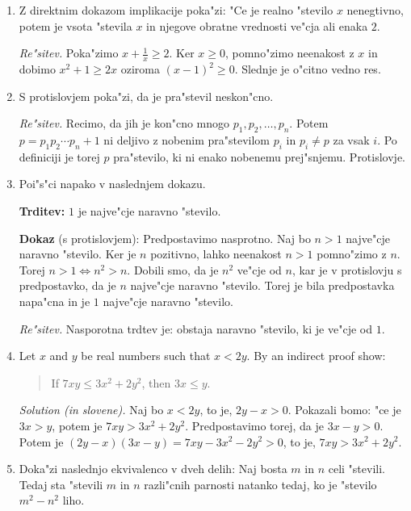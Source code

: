 \documentclass[11pt,paper=b5,footinclude,headinclude]{scrbook} %
\theoremstyle{remark}
\theoremstyle{definition} %
\theoremstyle{theorem} %
\begin{document}
\begin{enumerate}

\item Z direktnim dokazom implikacije poka"zi: "Ce je realno "stevilo $x$ nenegtivno, potem je vsota  "stevila $x$  in njegove obratne vrednosti  ve"cja ali enaka $2$.


\emph{ Re"sitev.} Poka"zimo $x + \frac{1}{x}\geq 2$. Ker $x\geq 0$, pomno"zimo neenakost z $x$ in dobimo
$x^2 + 1 \geq 2x$ oziroma $(x- 1)^2\geq 0$. Slednje je o"citno vedno res.

\item S protislovjem poka"zi, da je pra"stevil neskon"cno.

\emph{ Re"sitev.} Recimo, da jih je kon"cno mnogo $p_1,p_2,\ldots, p_n$. Potem  $p=p_1p_2\cdots p_n+1$ ni deljivo z nobenim pra"stevilom $p_i$ in $p_i\neq p$ za vsak $i$. Po definiciji je torej $p$ pra"stevilo, ki ni enako nobenemu prej"snjemu. Protislovje.

\item Poi"s"ci napako v naslednjem dokazu. 

\textbf{Trditev:} $1$ je najve"cje naravno "stevilo. 

\textbf{Dokaz} (s protislovjem):
Predpostavimo nasprotno. Naj bo $n>1$ najve"cje naravno "stevilo. Ker je $n$ pozitivno, lahko neenakost $n>1$ pomno"zimo z $n$. Torej $n>1\Leftrightarrow n^2>n$. Dobili smo, da je $n^2$ ve"cje od $n$, kar je v protislovju s predpostavko, da je $n$ najve"cje naravno "stevilo. Torej je bila predpostavka napa"cna in je $1$ najve"cje naravno "stevilo.

\emph{ Re"sitev.} Nasporotna trdtev je: obstaja naravno "stevilo, ki je ve"cje od $1$.


\item Let  $x$ and $y$ be real numbers such that $x<2y$. 
By an indirect proof show: 
\begin{quote}
    If $7xy\leq 3x^2 + 2y^2$, then $3x\leq y$.
\end{quote}

\emph{ Solution (in slovene).} Naj bo $x<2y$, to je, $2y-x>0$. Pokazali bomo: "ce je $3x> y$, potem je $7xy > 3x^2 + 2y^2$. Predpostavimo torej, da je $3x-y>0$. Potem je $(2y-x)(3x-y)= 7xy - 3x^2 - 2y^2>0$, to je, $7xy > 3x^2 + 2y^2$.

\item Doka"zi naslednjo ekvivalenco v dveh delih: Naj bosta $m$ in $n$ celi "stevili. Tedaj sta "stevili $m$ in $n$ razli"cnih parnosti natanko tedaj, ko je "stevilo $m^2- n^2$ liho.


\end{enumerate}
\end{document}
